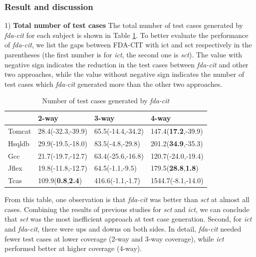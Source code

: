 \documentclass[10pt,journal,compsoc]{IEEEtran}
\begin{document}

\subsubsection{Result and discussion}

1) \textbf{Total number of test cases}
The total number of test cases generated by \emph{fda-cit} for each subject is shown in Table \ref{num-fda-cit}. To better evaluate the performance of \emph{fda-cit}, we list the gaps between FDA-CIT with ict and sct respectively in the parentheses (the first number is for \emph{ict}, the second one is \emph{sct}). The value with negative sign indicates the reduction in the test cases between \emph{fda-cit} and other two approaches, while the value without negative sign indicates the number of test cases which \emph{fda-cit} generated more than the other two approaches.

\begin{table}[ht]
\caption{Number of test cases generated by \emph{fda-cit}}
\label{num-fda-cit}
\centering
    \begin{tabular}{|l|l|l|l|}
    \hline
    ~      & 2-way                     & 3-way                     & 4-way                       \\ \hline
Tomcat	&28.4(-32.3,-39.9)	&65.5(-14.4,-34.2)	&147.4(\textbf{17.2},-39.9)	\\
Hsqldb	&29.9(-19.5,-18.0)	&83.5(-4.8,-29.8)	&201.2(\textbf{34.9},-35.3)	\\
Gcc	&21.7(-19.7,-12.7)	&63.4(-25.6,-16.8)	&120.7(-24.0,-19.4)	\\
Jflex	&19.8(-11.8,-12.7)	&64.5(-1.1,-9.5)	&179.5(\textbf{28.8},\textbf{1.8})	\\
Tcas	&109.9(\textbf{0.8},\textbf{2.4})	&416.6(-1.1,-1.7)	&1544.7(-8.1,-14.0)	\\\hline
    \end{tabular}
\end{table}

From this table, one observation is that \emph{fda-cit} was better than \emph{sct} at almost all cases. Combining the results of previous studies for \emph{sct} and \emph{ict}, we can conclude that \emph{sct} was the most inefficient approach at test case generation. Second, for \emph{ict} and \emph{fda-cit}, there were ups and downs on both sides. In detail, \emph{fda-cit} needed fewer test cases at lower coverage (2-way  and 3-way coverage), while \emph{ict} performed better at higher coverage (4-way).
\end{document}
